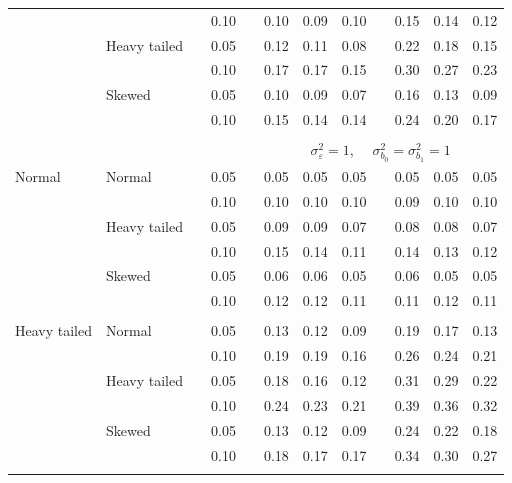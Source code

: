 \documentclass[12pt]{article} %
\begin{document}
\begin{table}[ht]
\begin{scriptsize}
\begin{center}
\begin{tabular}{ll p{.1cm} c p{.1cm} rrr p{.1cm} rrr}
             &              && 0.10 &&  0.10 & 0.09 & 0.10 && 0.15 & 0.14 & 0.12 \\ 
             & Heavy tailed && 0.05 &&  0.12 & 0.11 & 0.08 && 0.22 & 0.18 & 0.15 \\ 
             &              && 0.10 &&  0.17 & 0.17 & 0.15 && 0.30 & 0.27 & 0.23 \\ 
             & Skewed       && 0.05 &&  0.10 & 0.09 & 0.07 && 0.16 & 0.13 & 0.09 \\ 
             &              && 0.10 &&  0.15 & 0.14 & 0.14 && 0.24 & 0.20 & 0.17 \\ 

&&&&&&&&&&&\\
& && && \multicolumn{7}{c}{$\sigma_{\varepsilon}^2 = 1$, \ \ $\sigma_{b_0}^2 = \sigma_{b_1}^2 = 1$} \\ \cline{6-12}
\rowcolor{gray!20}Normal       & Normal       && 0.05 &&  0.05 & 0.05 & 0.05 && 0.05 & 0.05 & 0.05 \\ 
\rowcolor{gray!20}             &              && 0.10 &&  0.10 & 0.10 & 0.10 && 0.09 & 0.10 & 0.10 \\ 
\rowcolor{gray!20}             & Heavy tailed && 0.05 &&  0.09 & 0.09 & 0.07 && 0.08 & 0.08 & 0.07 \\ 
\rowcolor{gray!20}             &              && 0.10 &&  0.15 & 0.14 & 0.11 && 0.14 & 0.13 & 0.12 \\ 
\rowcolor{gray!20}             & Skewed       && 0.05 &&  0.06 & 0.06 & 0.05 && 0.06 & 0.05 & 0.05 \\ 
\rowcolor{gray!20}             &              && 0.10 &&  0.12 & 0.12 & 0.11 && 0.11 & 0.12 & 0.11 \\ 
             &&&&&&&&&&&\\
Heavy tailed & Normal       && 0.05 &&  0.13 & 0.12 & 0.09 && 0.19 & 0.17 & 0.13 \\ 
             &              && 0.10 &&  0.19 & 0.19 & 0.16 && 0.26 & 0.24 & 0.21 \\ 
             & Heavy tailed && 0.05 &&  0.18 & 0.16 & 0.12 && 0.31 & 0.29 & 0.22 \\ 
             &              && 0.10 &&  0.24 & 0.23 & 0.21 && 0.39 & 0.36 & 0.32 \\ 
             & Skewed       && 0.05 &&  0.13 & 0.12 & 0.09 && 0.24 & 0.22 & 0.18 \\ 
             &              && 0.10 &&  0.18 & 0.17 & 0.17 && 0.34 & 0.30 & 0.27 \\
             &&&&&&&&&&&\\ 

\end{tabular}
\end{center}
\end{scriptsize}
\end{table}
\end{document}
